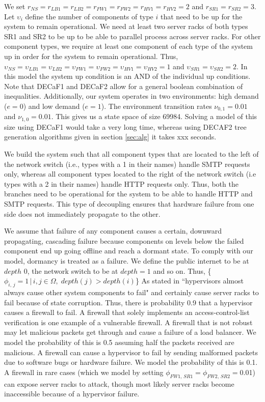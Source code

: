 \documentclass[12pt]{article}
\begin{document}
We set $r_{NS} = r_{LB1} = r_{LB2} = r_{FW1} = r_{FW2} = r_{HV1} = r_{HV2} =
2$ and $r_{SR1} = r_{SR2} = 3$. Let $\upsilon_i$ define the number of
components of type $i$ that need to be up for the system to remain
operational. We need at least two server racks of both types SR1 and SR2 to
be up to be able to parallel process across server racks. For other component
types, we require at least one component of each type of the system up in
order for the system to remain operational. Thus, $\upsilon_{NS} =
\upsilon_{LB1} = \upsilon_{LB2} = \upsilon_{FW1} = \upsilon_{FW2} =
\upsilon_{HV1} = \upsilon_{HV2} = 1$ and $\upsilon_{SR1} = \upsilon_{SR2} =
2$. In this model the system up condition is an AND of the individual up
conditions. Note that DECaF1 and DECaF2 allow for a general boolean
combination of inequalities. Additionally, our system operates in two
environments: high demand ($e = 0$) and low demand ($e = 1$). The environment
transition rates $\nu_{0, 1} = 0.01$ and $\nu_{1, 0} = 0.01$. This gives us a
state space of size 69984. Solving a model of this size using DECaF1 would
take a very long time, whereas using DECAF2 tree generation algorithms given
in section \ref{sec:alg} it takes xxx seconds.

We build the system such that all component types that are located to the left
of the network switch (i.e., types with a 1 in their names) handle SMTP
requests only, whereas all component types located to the right of the network
switch (i.e types with a 2 in their names) handle HTTP requests only. Thus,
both the branches need to be operational for the system to be able to handle
HTTP and SMTP requests. This type of decoupling ensures that hardware failure
from one side does not immediately propagate to the other.

We assume that failure of any component causes a certain, downward
propagating, cascading failure because components on levels below the failed
component end up going offline and reach a dormant state. To comply with our
model, dormancy is treated as a failure. We define the public internet to be
at $depth$ 0, the network switch to be at $depth = 1$ and so on. Thus,
\{$\phi_{i,\,j}  = 1 \, | \, i, j \in \Omega, \; depth(j) > depth(i)$\} As
stated in \cite{ReHype:2011} ``hypervisors almost always cause other system
components to fail" and certainly cause server racks to fail because of state
corruption. Thus, there is probability 0.9 that a hypervisor causes a firewall
to fail. A firewall that solely implements an access-control-list verification
is one example of a vulnerable firewall. A firewall that is not robust may let
malicious packets get through and cause a failure of a load balancer. We model
the probability of this is 0.5 assuming half the packets received are malicious. A
firewall can cause a hypervisor to fail by sending malformed packets due to
software bugs or hardware failure. We model the probability of this is 0.1. A
firewall in rare cases (which we model by setting $\phi_{FW1, \, SR1} =
\phi_{FW2, \, SR2} = 0$.01) can expose server racks to attack, though most
likely server racks become inaccessible because of a hypervisor failure.
\end{document}
